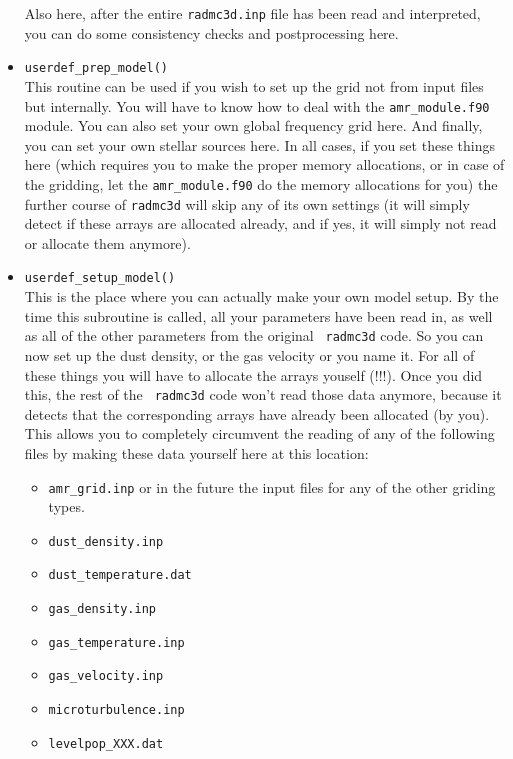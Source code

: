 \documentclass{report}
\begin{document}
\begin{itemize}
  Also here, after the entire {\small\tt radmc3d.inp} file has been read
  and interpreted, you can do some consistency checks and postprocessing
  here.
\item {\small\tt userdef\_prep\_model()}\\
  This routine can be used if you wish to set up the grid not from input
  files but internally. You will have to know how to deal with the
  {\small\tt amr\_module.f90} module. You can also set your own global
  frequency grid here. And finally, you can set your own stellar sources
  here. In all cases, if you set these things here (which requires you to
  make the proper memory allocations, or in case of the gridding, let
  the {\small\tt amr\_module.f90} do the memory allocations for you) 
  the further course of {\small\tt radmc3d} will skip any of its own
  settings (it will simply detect if these arrays are allocated already,
  and if yes, it will simply not read or allocate them anymore).
\item {\small\tt userdef\_setup\_model()}\\
  This is the place where you can actually make your own model setup.  By
  the time this subroutine is called, all your parameters have been read in,
  as well as all of the other parameters from the original {\small\tt
    radmc3d} code. So you can now set up the dust density, or the gas
  velocity or you name it. For all of these things you will have to allocate
  the arrays youself (!!!). Once you did this, the rest of the {\small\tt
    radmc3d} code won't read those data anymore, because it detects that the
  corresponding arrays have already been allocated (by you). This allows
  you to completely circumvent the reading of any of the following files
  by making these data yourself here at this location:
  \begin{itemize}
    \item {\small\tt amr\_grid.inp} or in the
      future the input files for any of the other griding types.
    \item {\small\tt dust\_density.inp}
    \item {\small\tt dust\_temperature.dat}
    \item {\small\tt gas\_density.inp}
    \item {\small\tt gas\_temperature.inp} 
    \item {\small\tt gas\_velocity.inp}
    \item {\small\tt microturbulence.inp}
    \item {\small\tt levelpop\_XXX.dat} 

\end{itemize}
\end{itemize}
\end{document}
